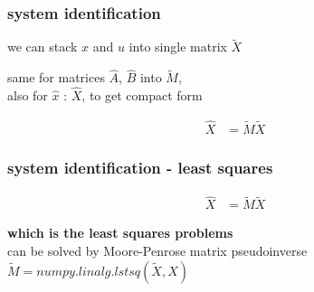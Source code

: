 \documentclass{beamer}
\begin{document}
\begin{frame}
  
  \frametitle{\bf system identification}
  we can stack  $x$ and $u$ into single matrix $\tilde{X}$ 
  

  same for matrices $\hat{A}$, $\hat{B}$  into $\tilde{M}$, \\
  also for $\hat{x}$ : $\hat{X}$, to get compact form 

  \begin{align*}
    \hat{X} &= \tilde{M}\tilde{X}
  \end{align*}

\end{frame}

\begin{frame}
  
  \frametitle{\bf system identification - least squares}

  \begin{align*}
    \hat{X} &= \tilde{M}\tilde{X}
  \end{align*}
  
  {\bf which is the least squares problems} \\
  can be solved by Moore-Penrose matrix pseudoinverse
  $\tilde{M} = numpy.linalg.lstsq(\tilde{X}, X)$

\end{frame}
\end{document}
